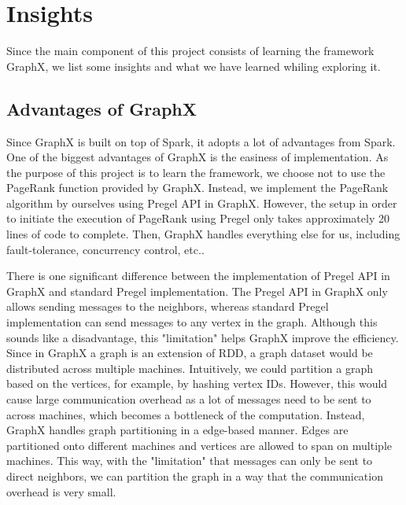 \section{Insights}
%
Since the main component of this project consists of learning the framework GraphX, we list some insights and what we have learned whiling exploring it.
%
\subsection{Advantages of GraphX}
%
Since GraphX is built on top of Spark, it adopts a lot of advantages from Spark.
%
One of the biggest advantages of GraphX is the easiness of implementation.
%
As the purpose of this project is to learn the framework, we choose not to use the PageRank function provided by GraphX.
%
Instead, we implement the PageRank algorithm by ourselves using Pregel API in GraphX.
%
However, the setup in order to initiate the execution of PageRank using Pregel only takes approximately 20 lines of code to complete.
%
Then, GraphX handles everything else for us, including fault-tolerance, concurrency control, etc..
%

There is one significant difference between the implementation of Pregel API in GraphX and standard Pregel implementation.
%
The Pregel API in GraphX only allows sending messages to the neighbors, whereas standard Pregel implementation can send messages to any vertex in the graph.
%
Although this sounds like a disadvantage, this "limitation" helps GraphX improve the efficiency.
%
Since in GraphX a graph is an extension of RDD, a graph dataset would be distributed across multiple machines.
%
Intuitively, we could partition a graph based on the vertices, for example, by hashing vertex IDs.
%
However, this would cause large communication overhead as a lot of messages need to be sent to across machines, which becomes a bottleneck of the computation.
%
Instead, GraphX handles graph partitioning in a edge-based manner.
%
Edges are partitioned onto different machines and vertices are allowed to span on multiple machines.
%
This way, with the "limitation" that messages can only be sent to direct neighbors, we can partition the graph in a way that the communication overhead is very small.
%

